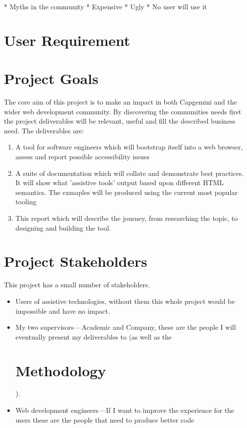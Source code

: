 * Myths in the community
  * Expensive
  * Ugly
  * No user will use it

\section{User Requirement}


\section{Project Goals}
The core aim of this project is to make an impact in both Capgemini and the
wider web development community. By discovering the communities needs first
the project deliverables will be relevant, useful and fill the described
business need. The deliverables are:
\begin{enumerate}
  \item A tool for software engineers which will bootstrap itself into a web
browser, assess and report possible accessibility issues
  \item A suite of documentation which will collate and demonstrate best
practices. It will show what 'assistive tools' output based upon different
HTML semantics. The exmaples will be produced using the current most popular
tooling
  \item This report which will describe the journey, from researching the
topic, to designing and building the tool.
\end{enumerate}

\section{Project Stakeholders}
This project has a small number of stakeholders.
\begin{itemize}
  \item Users of assistive technologies, without them this whole project would be impossible and have no impact.
  \item My two supervisors — Academic and Company, these are the people I will eventually present my deliverables to (as well as the
  \section{Methodology}).
  \item Web development engineers — If I want to improve the experience for the users these are the people that need to produce better code
\end{itemize}

